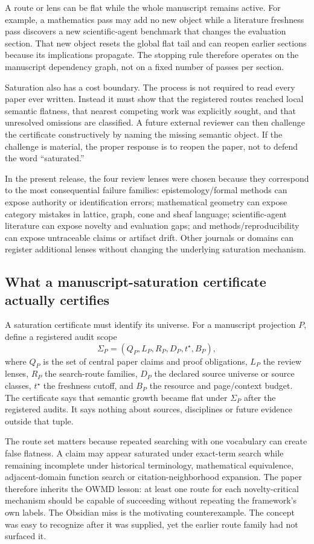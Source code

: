 A route or lens can be flat while the whole manuscript remains active. For example, a mathematics pass may add no new object while a literature freshness pass discovers a new scientific-agent benchmark that changes the evaluation section. That new object resets the global flat tail and can reopen earlier sections because its implications propagate. The stopping rule therefore operates on the manuscript dependency graph, not on a fixed number of passes per section.

Saturation also has a cost boundary. The process is not required to read every paper ever written. Instead it must show that the registered routes reached local semantic flatness, that nearest competing work was explicitly sought, and that unresolved omissions are classified. A future external reviewer can then challenge the certificate constructively by naming the missing semantic object. If the challenge is material, the proper response is to reopen the paper, not to defend the word ``saturated.''

In the present release, the four review lenses were chosen because they correspond to the most consequential failure families: epistemology/formal methods can expose authority or identification errors; mathematical geometry can expose category mistakes in lattice, graph, cone and sheaf language; scientific-agent literature can expose novelty and evaluation gaps; and methods/reproducibility can expose untraceable claims or artifact drift. Other journals or domains can register additional lenses without changing the underlying saturation mechanism.

\subsection{What a manuscript-saturation certificate actually certifies}

A saturation certificate must identify its universe. For a manuscript projection \(P\), define a registered audit scope
\[
\Sigma_P=(Q_P,L_P,R_P,D_P,t^\star,B_P),
\]
where \(Q_P\) is the set of central paper claims and proof obligations, \(L_P\) the review lenses, \(R_P\) the search-route families, \(D_P\) the declared source universe or source classes, \(t^\star\) the freshness cutoff, and \(B_P\) the resource and page/context budget. The certificate says that semantic growth became flat under \(\Sigma_P\) after the registered audits. It says nothing about sources, disciplines or future evidence outside that tuple.

The route set matters because repeated searching with one vocabulary can create false flatness. A claim may appear saturated under exact-term search while remaining incomplete under historical terminology, mathematical equivalence, adjacent-domain function search or citation-neighborhood expansion. The paper therefore inherits the OWMD lesson: at least one route for each novelty-critical mechanism should be capable of succeeding without repeating the framework's own labels. The Obsidian miss is the motivating counterexample. The concept was easy to recognize after it was supplied, yet the earlier route family had not surfaced it.

